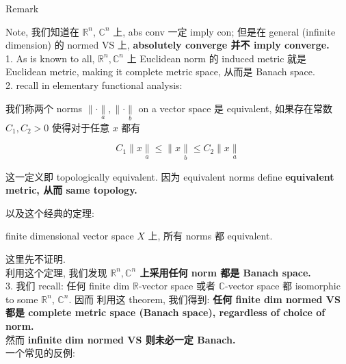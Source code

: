 \documentclass{qlnotes-export}
\begin{document}
\begin{qlremark}{Remark}

Note, 我们知道在 \({\mathbb{R}}^{n}\), \({\mathbb{C}}^{n}\) 上, abs conv 一定 imply con; 但是在 general (infinite dimension) 的 normed VS 上, \textbf{absolutely converge 并不 imply converge.}\\
1. As is known to all, \({\mathbb{R}}^{n},{\mathbb{C}}^{n}\) 上 Euclidean norm 的 induced metric 就是 Euclidean metric, making it complete metric space, 从而是 Banach space.\\
2. recall in elementary functional analysis:

\begin{definition}\label{def-09-l-p-space-and-inequalities-definition-004}

我们称两个 norms \(\parallel \cdot \underset{a}{\parallel}, \parallel \cdot \underset{b}{\parallel}\) on a vector space 是 equivalent, 如果存在常数 \(C_{1},C_{2} > 0\) 使得对于任意 \(x\) 都有

\[C_{1} \parallel x\underset{a}{\parallel} \leq \parallel x\underset{b}{\parallel} \leq C_{2} \parallel x\underset{a}{\parallel}\]

这一定义即 topologically equivalent. 因为 equivalent norms define \textbf{equivalent metric, 从而 same topology.}

\end{definition}

以及这个经典的定理:

\begin{theorem}\label{thm-09-l-p-space-and-inequalities-theorem-002}

finite dimensional vector space \(X\) 上, 所有 norms 都 equivalent.

\end{theorem}

这里先不证明.\\
利用这个定理, 我们发现 \textbf{\({\mathbb{R}}^{n},{\mathbb{C}}^{n}\) 上采用任何 norm 都是 Banach space.}\\
3. 我们 recall: 任何 finite dim \(\mathbb{R}\)-vector space 或者 \(\mathbb{C}\)-vector space 都 isomorphic to some \({\mathbb{R}}^{n}\), \({\mathbb{C}}^{n}\). 因而 利用这 theorem, 我们得到: \textbf{任何 finite dim normed VS 都是 complete metric space (Banach space), regardless of choice of norm.}\\
然而 \textbf{infinite dim normed VS 则未必一定 Banach.}\\
一个常见的反例:


\end{qlremark}
\end{document}
